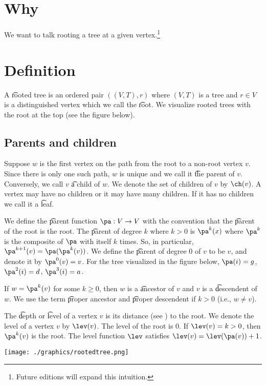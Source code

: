 
\section*{Why}

We want to talk rooting a tree at a given vertex.\footnote{Future editions will expand this intuition.}

\section*{Definition}

A \t{rooted tree} is an ordered pair $((V, T), r)$ where $(V, T)$ is a tree and $r \in V$ is a distinguished vertex which we call the \t{root}.
We visualize rooted trees with the root at the top (see the figure below).

\subsection*{Parents and children}

Suppose $w$ is the first vertex on the path from the root to a non-root vertex $v$.
Since there is only one such path, $w$ is unique and we call it \t{the parent} of $v$.
Conversely, we call $v$ \t{a child} of $w$.
We denote the set of children of $v$ by $\ch(v)$.
A vertex may have no children or it may have many children.
If it has no children we call it a \t{leaf}.

We define the \t{parent function} $\pa: V \to V$ with the convention that the \t{parent of the root} is the root.
The \t{parent of degree $k$} where $k > 0$ is $\pa^k(x)$ where $\pa^k$ is the composite of $\pa$ with itself $k$ times.
So, in particular, $\pa^{k+1}(v) = \pa(\pa^k(v))$.
We define the \t{parent of degree $0$} of $v$ to be $v$, and denote it by $\pa^0(v) = v$.
For the tree visualized in the figure below, $\pa(i) = g$, $\pa^2(i) = d$, $\pa^3(i) = a$.

If $w = \pa^k(v)$ for some $k \geq 0$, then $w$ is a \t{ancestor} of $v$ and $v$ is a \t{descendent} of $w$.
We use the term \t{proper ancestor} and \t{proper descendent} if $k > 0$ (i.e., $w \neq v$).

The \t{depth} or \t{level} of a vertex $v$ is its distance (see ) to the root.
We denote the level of a vertex $v$ by $\lev(v)$.
The level of the root is $0$.
If $\lev(v) = k > 0$, then $\pa^{k}(v)$ is the root.
The level function $\lev$ satisfies $\lev(v) = \lev(\pa(v)) + 1$.

\begin{center}\texttt{[image: ./graphics/rootedtree.png]}\end{center}
